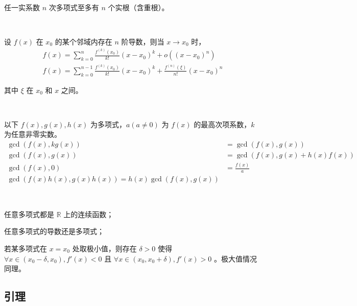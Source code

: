 \begin{fact}[代数基本定理的推论]~

	任一实系数 $n$ 次多项式至多有 $n$ 个实根（含重根）。

\end{fact}

\begin{fact}[带余项的泰勒公式]~
	
	设 $f(x)$ 在 $x_0$ 的某个邻域内存在 $n$ 阶导数，则当 $x \rightarrow x_0$ 时，
	$$
	\begin{aligned}
	f(x) = \sum_{k = 0}^{n} \frac{f^{(k)}(x_0)}{k!} (x - x_0)^k + o((x - x_0)^n) \\
	f(x) = \sum_{k = 0}^{n - 1} \frac{f^{(k)}(x_0)}{k!} (x - x_0)^k + \frac{f^{(n)}(\xi)}{n!} (x - x_0)^n
	\end{aligned}
	$$
	
	其中 $\xi$ 在 $x_0$ 和 $x$ 之间。
	
\end{fact}

\begin{fact}[最大公因式的基本性质]~

	以下 $f(x), g(x), h(x)$ 为多项式，$a (a \neq 0)$ 为 $f(x)$ 的最高次项系数，$k$ 为任意非零实数。
	$$
	\begin{aligned}
	\gcd(f(x), kg(x)) & = \gcd(f(x), g(x)) \\
	\gcd(f(x), g(x)) &= \gcd(f(x), g(x) + h(x)f(x)) \\
	\gcd(f(x), 0) & = \frac{f(x)}{a} \\
	\gcd(f(x)h(x), g(x)h(x)) = h(x) \gcd(f(x), g(x))
	\end{aligned}
	$$

\end{fact}

\begin{fact}[多项式的微分性质]~

	任意多项式都是 $\mathbb{R}$ 上的连续函数；
	
	任意多项式的导数还是多项式；

	若某多项式在 $x = x_0$ 处取极小值，则存在 $\delta > 0$ 使得 $\forall x \in (x_0 - \delta, x_0), f'(x) < 0$ 且 $\forall x \in (x_0, x_0 + \delta), f'(x) > 0$ 。极大值情况同理。
	
\end{fact}

\subsection{引理}

